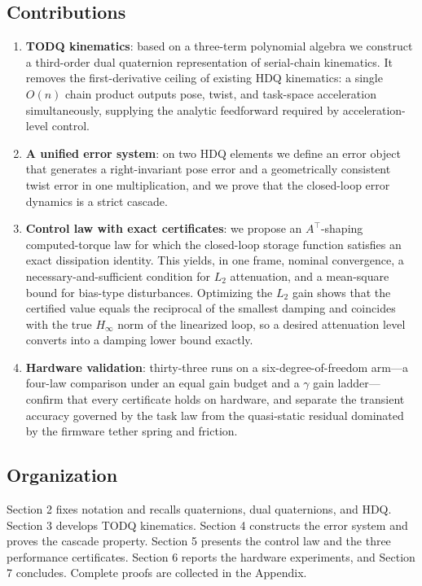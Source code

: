 \subsection{Contributions}

\begin{enumerate}[leftmargin=2em]
  \item \textbf{TODQ kinematics}: based on a three-term polynomial algebra we construct a third-order dual quaternion representation of serial-chain kinematics. It removes the first-derivative ceiling of existing HDQ kinematics: a single $O(n)$ chain product outputs pose, twist, and task-space acceleration simultaneously, supplying the analytic feedforward required by acceleration-level control.
  \item \textbf{A unified error system}: on two HDQ elements we define an error object that generates a right-invariant pose error and a geometrically consistent twist error in one multiplication, and we prove that the closed-loop error dynamics is a strict cascade.
  \item \textbf{Control law with exact certificates}: we propose an $A^\top$-shaping computed-torque law for which the closed-loop storage function satisfies an exact dissipation identity. This yields, in one frame, nominal convergence, a necessary-and-sufficient condition for $L_2$ attenuation, and a mean-square bound for bias-type disturbances. Optimizing the $L_2$ gain shows that the certified value equals the reciprocal of the smallest damping and coincides with the true $H_\infty$ norm of the linearized loop, so a desired attenuation level converts into a damping lower bound exactly.
  \item \textbf{Hardware validation}: thirty-three runs on a six-degree-of-freedom arm---a four-law comparison under an equal gain budget and a $\gamma$ gain ladder---confirm that every certificate holds on hardware, and separate the transient accuracy governed by the task law from the quasi-static residual dominated by the firmware tether spring and friction.
\end{enumerate}

\subsection{Organization}

Section 2 fixes notation and recalls quaternions, dual quaternions, and HDQ. Section 3 develops TODQ kinematics. Section 4 constructs the error system and proves the cascade property. Section 5 presents the control law and the three performance certificates. Section 6 reports the hardware experiments, and Section 7 concludes. Complete proofs are collected in the Appendix.


